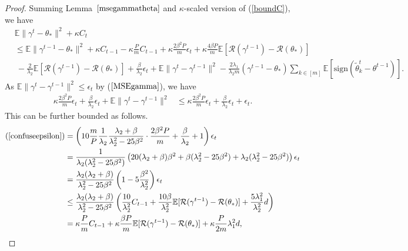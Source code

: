 \documentclass{article} %
\begin{document}
\begin{proof}
Summing Lemma~$\ref{msegammatheta}$ and $\kappa$-scaled version of (\ref{boundC}), we have
\begin{align}
    &\mathbb{E}\lVert \gamma^t-\theta_* \rVert^2+\kappa C_t \nonumber \\
    &\le\nonumber \mathbb{E}\lVert \gamma^{t-1}-\theta_*\rVert^2 + \kappa C_{t-1}  -\kappa\frac{P}{m}C_{t-1}+\kappa\frac{2\beta^2P}{m}\epsilon_t+\kappa\frac{4\beta P}{m}\mathbb{E}[\mathcal{R}(\gamma^{t-1})-\mathcal{R}(\theta_*)] \\
    &~ - \frac{2}{\lambda_2}\mathbb{E}[\mathcal{R}(\gamma^{t-1})-\mathcal{R}(\theta_*)]+\frac{\beta}{\lambda_2}\epsilon_t+\mathbb{E}\lVert \gamma^t-\gamma^{t-1} \rVert^2 -\frac{2\lambda_1}{\lambda_2 m}({\gamma^{t-1}-\theta_*})\sum_{k\in [m]}\mathbb{E}[\mathrm{sign}(\tilde{\theta}_k^t-\theta^{t-1})]. \label{confuse} 
\end{align}
As $\mathbb{E}\lVert \gamma^t-\gamma^{t-1} \rVert^2 \le \epsilon_t$ by ($\ref{MSEgamma}$), we have
\begin{align}\label{confuseepsilon}
    \kappa\frac{2\beta^2P}{m}\epsilon_t+\frac{\beta}{\lambda_2}\epsilon_t+\mathbb{E}\lVert \gamma^t-\gamma^{t-1} \rVert^2
    &\le \kappa\frac{2\beta^2P}{m}\epsilon_t+\frac{\beta}{\lambda_2}\epsilon_t+\epsilon_t.
\end{align}
This can be further bounded as follows.%
\begin{align*}
    (\ref{confuseepsilon})
    &= \left( 10\frac{m}{P}\frac{1}{\lambda_2}\frac{\lambda_2+\beta}{\lambda_2^2-25\beta^2}\cdot\frac{2\beta^2P}{m} + \frac{\beta}{\lambda_2}+1  \right) \epsilon_t\\
    &=\frac{1}{\lambda_2 (\lambda_2^2-25\beta^2)} \left( 20(\lambda_2+\beta)\beta^2+\beta(\lambda_2^2-25\beta^2)+\lambda_2(\lambda_2^2-25\beta^2) \right) \epsilon_t\\
    &=\frac{\lambda_2(\lambda_2+\beta)}{\lambda_2^2-25\beta^2} \left(1-5\frac{\beta^2}{\lambda_2^2}\right) \epsilon_t\\
    &\le \frac{\lambda_2(\lambda_2+\beta)}{\lambda_2^2-25\beta^2} \left( \frac{10}{\lambda_2^2}C_{t-1} + \frac{10\beta}{\lambda_2^2}\mathbb{E}[\mathcal{R}(\gamma^{t-1})-\mathcal{R}(\theta_*)]+\frac{5\lambda_1^2}{\lambda_2^2}d \right) \\
    &=\kappa\frac{P}{m} C_{t-1}+\kappa\frac{\beta P}{m}\mathbb{E}[\mathcal{R}(\gamma^{t-1})-\mathcal{R}(\theta_*)]+\kappa\frac{P}{2m}\lambda_1^2d,

\end{align*}
\end{proof}
\end{document}
